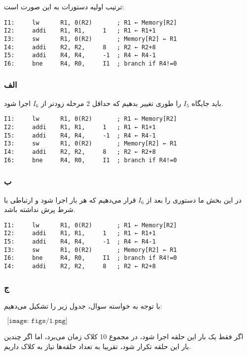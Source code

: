 ترتیب اولیه دستورات به این صورت است:

\setLTR
\begin{lstlisting}
I1:     lw      R1, 0(R2)       ; R1 ← Memory[R2]
I2:     addi    R1, R1,     1   ; R1 ← R1+1
I3:     sw      R1, 0(R2)       ; Memory[R2] ← R1
I4:     addi    R2, R2,     8   ; R2 ← R2+8
I5:     addi    R4, R4,     -1  ; R4 ← R4-1
I6:     bne     R4, R0,     I1  ; branch if R4!=0
\end{lstlisting}
\setRTL

\subsubsection*{الف}
باید جایگاه
$I_5$
را طوری تغییر بدهیم که حداقل 2 مرحله زودتر از 
$I_6$
اجرا شود.

\setLTR
\begin{lstlisting}
I1:     lw      R1, 0(R2)       ; R1 ← Memory[R2]
I2:     addi    R1, R1,     1   ; R1 ← R1+1
I5:     addi    R4, R4,     -1  ; R4 ← R4-1
I3:     sw      R1, 0(R2)       ; Memory[R2] ← R1
I4:     addi    R2, R2,     8   ; R2 ← R2+8
I6:     bne     R4, R0,     I1  ; branch if R4!=0
\end{lstlisting}
\setRTL

\subsubsection*{ب}
در این بخش ما دستوری را بعد از 
$I_6$
قرار می‌دهیم که هر بار اجرا شود و ارتباطی با شرط پرش نداشته باشد.

\setLTR
\begin{lstlisting}
I1:     lw      R1, 0(R2)       ; R1 ← Memory[R2]
I2:     addi    R1, R1,     1   ; R1 ← R1+1
I5:     addi    R4, R4,     -1  ; R4 ← R4-1
I3:     sw      R1, 0(R2)       ; Memory[R2] ← R1
I6:     bne     R4, R0,     I1  ; branch if R4!=0
I4:     addi    R2, R2,     8   ; R2 ← R2+8
\end{lstlisting}
\setRTL

\subsubsection*{ج}

با توجه به خواسته سوال، جدول زیر را تشکیل می‌دهیم:
\setLTR

$ \ \ \texttt{[image: figs/1.png]}$

\setRTL

اگر فقط یک بار این حلقه اجرا شود، در مجموع 10 کلاک زمان می‌برد، اما اگر چندین بار این حلقه تکرار شود، تقریبا به تعداد حلقه‌ها نیاز به کلاک داریم.



